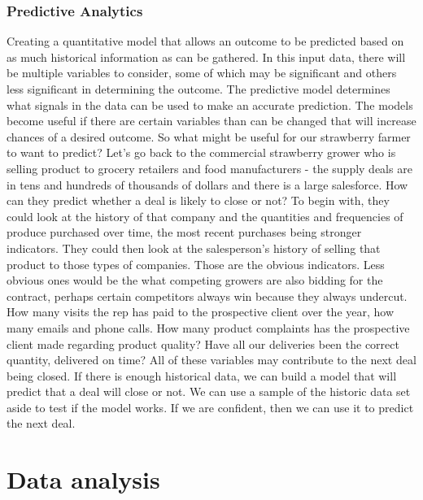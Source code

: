 \documentclass[a4paper,12pt,oneside]{report}
\begin{document}
{{\subsubsection{Predictive Analytics }
{Creating a quantitative model that allows an outcome to be predicted based on as much historical information as can be gathered. In this input data, there will be multiple variables to consider, some of which may be significant and others less significant in determining the outcome. The predictive model determines what signals in the data can be used to make an accurate prediction. The models become useful if there are certain variables than can be changed that will increase chances of a desired outcome. So what might be useful for our strawberry farmer to want to predict? Let's go back to the commercial strawberry grower who is selling product to grocery retailers and food manufacturers - the supply deals are in tens and hundreds of thousands of dollars and there is a large salesforce. How can they predict whether a deal is likely to close or not? To begin with, they could look at the history of that company and the quantities and frequencies of produce purchased over time, the most recent purchases being stronger indicators. They could then look at the salesperson's history of selling that product to those types of companies. Those are the obvious indicators. Less obvious ones would be the what competing growers are also bidding for the contract, perhaps certain competitors always win because they always undercut. How many visits the rep has paid to the prospective client over the year, how many emails and phone calls. How many product complaints has the prospective client made regarding product quality? Have all our deliveries been the correct quantity, delivered on time? All of these variables may contribute to the next deal being closed. If there is enough historical data, we can build a model that will predict that a deal will close or not. We can use a sample of the historic data set aside to test if the model works. If we are confident, then we can use it to predict the next deal.}
\section{Data analysis}
}}
\end{document}
